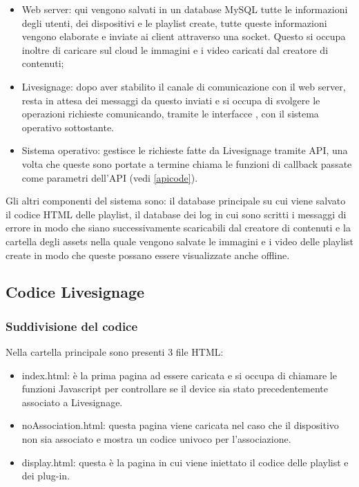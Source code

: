 \begin{itemize}
    \item Web server: qui vengono salvati in un database MySQL tutte le informazioni degli utenti, dei dispositivi e le playlist create, tutte queste informazioni vengono elaborate e inviate ai client attraverso una socket. Questo si occupa inoltre di caricare sul cloud le immagini e i video caricati dal creatore di contenuti;
    \item Livesignage: dopo aver stabilito il canale di comunicazione con il web server, resta in attesa dei messaggi da questo inviati e si occupa di svolgere le operazioni richieste  comunicando, tramite le interfacce , con il sistema operativo sottostante.
    \item Sistema operativo: gestisce le richieste fatte da Livesignage tramite API, una volta che queste sono portate a termine chiama le funzioni di callback passate come parametri dell'API (vedi \ref*{apicode}). 
\end{itemize}

Gli altri componenti del sistema sono: il database principale su cui viene salvato il codice HTML delle playlist, il database dei log in cui sono scritti i messaggi di errore in modo che siano successivamente scaricabili dal creatore di contenuti e la cartella degli assets nella quale vengono salvate le immagini e i video delle playlist create in modo che queste possano essere visualizzate anche offline.

\subsection{Codice Livesignage}

\subsubsection{Suddivisione del codice}

Nella cartella principale sono presenti 3 file HTML: 
\begin{itemize}
    \item index.html: è la prima pagina ad essere caricata e si occupa di chiamare le funzioni Javascript per controllare se il device sia stato precedentemente associato a Livesignage.
    \item noAssociation.html: questa pagina viene caricata nel caso che il dispositivo non sia associato e mostra un codice univoco per l'associazione.
    \item display.html: questa è la pagina in cui viene iniettato il codice delle playlist e dei plug-in.
\end{itemize}

